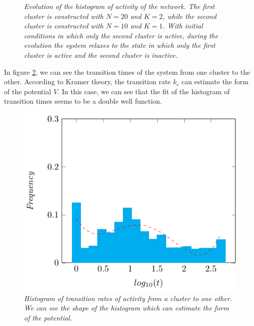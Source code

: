\begin{figure}[H]
\caption{\emph{Evolution of the histogram of activity of the network. The first cluster is constructed with $N=20$ and $K=2$, while the second cluster is constructed with $N=10$ and $K=1$. With initial conditions in which only the second cluster is active, during the evolution the system relaxes to the state in which only the first cluster is active and the second cluster is inactive.}}
\label{fig:distr}
\end{figure}
In figure \ref{fig:times}, we can see the transition times of the system from one cluster to the other. According to Kramer theory, the transition rate $k_c$ can estimate the form of the potential $V$. In this case, we can see that the fit of the histogram of transition times seems to be a double well function.

\begin{figure}[H]
\centering
\includegraphics[scale=1.4]{images/fittimes.pdf}
\caption{\emph{Histogram of transition rates of activity from a cluster to one other. We can see the shape of the histogram which can estimate the form of the potential.}}
\label{fig:times}
\end{figure}

